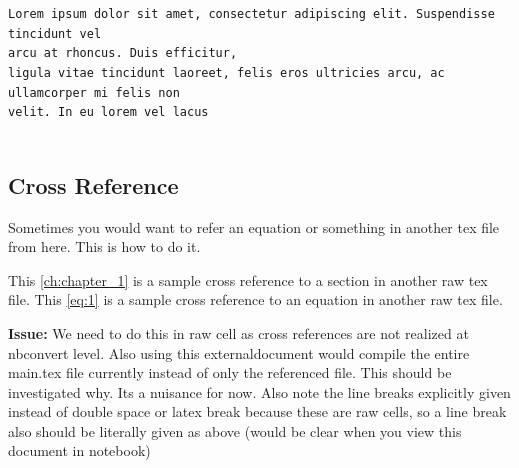 \documentclass[float=false,crop=false]{standalone}
\begin{document}
    \begin{center}
    \end{center}
    { \hspace*{\fill} \\}
    
    \begin{Verbatim}[commandchars=\\\{\},fontsize=\footnotesize]

Lorem ipsum dolor sit amet, consectetur adipiscing elit. Suspendisse tincidunt vel
arcu at rhoncus. Duis efficitur,
ligula vitae tincidunt laoreet, felis eros ultricies arcu, ac ullamcorper mi felis non
velit. In eu lorem vel lacus


    \end{Verbatim}

    \subsection{Cross Reference}\label{cross-reference}

Sometimes you would want to refer an equation or something in another
tex file from here. This is how to do it.

This \ref{ch:chapter_1} is a sample cross reference to a section in another raw tex file. 
This \ref{eq:1} is a sample cross reference to an equation in another raw tex file.

    \textbf{Issue:} We need to do this in raw cell as cross references are
not realized at nbconvert level. Also using this externaldocument would
compile the entire main.tex file currently instead of only the
referenced file. This should be investigated why. Its a nuisance for
now. Also note the line breaks explicitly given instead of double space
or latex break because these are raw cells, so a line break also should
be literally given as above (would be clear when you view this document
in notebook)


    
    
    
    
\end{document}
